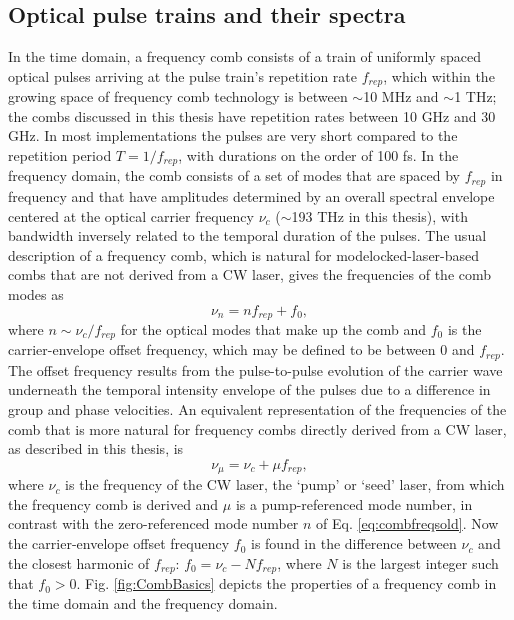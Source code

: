 \subsection{Optical pulse trains and their spectra}

In the time domain, a frequency comb consists of a train of uniformly spaced optical pulses arriving at the pulse train's repetition rate $f_{rep}$, which within the growing space of frequency comb technology is between $\sim$10 MHz and $\sim$1 THz; the combs discussed in this thesis have repetition rates between 10 GHz and 30 GHz. In most implementations the pulses are very short compared to the repetition period $T=1/f_{rep}$, with durations on the order of 100 fs. In the frequency domain, the comb consists of a set of modes that are spaced by $f_{rep}$ in frequency and that have amplitudes determined by an overall spectral envelope centered at the optical carrier frequency $\nu_c$ ($\sim$193 THz in this thesis), with bandwidth inversely related to the temporal duration of the pulses. The usual description of a frequency comb, which is natural for modelocked-laser-based combs that are not derived from a CW laser, gives the frequencies of the comb modes as 
\begin{equation}
\nu_n=nf_{rep}+f_0, \label{eq:combfreqsold}
\end{equation} 
where $n\sim \nu_c/f_{rep}$ for the optical modes that make up the comb and $f_0$ is the carrier-envelope offset frequency, which may be defined to be between $0$ and $f_{rep}$. The offset frequency results from the pulse-to-pulse evolution of the carrier wave underneath the temporal intensity envelope of the pulses due to a difference in group and phase velocities. An equivalent representation of the frequencies of the comb that is more natural for frequency combs directly derived from a CW laser, as described in this thesis, is
\begin{equation}
\nu_\mu=\nu_c+\mu f_{rep}, \label{eq:combfreqsnew}
\end{equation} 
where $\nu_c$ is the frequency of the CW laser, the `pump' or `seed' laser, from which the frequency comb is derived and $\mu$ is a pump-referenced mode number, in contrast with the zero-referenced mode number $n$ of Eq. \ref{eq:combfreqsold}. Now the carrier-envelope offset frequency $f_0$ is found in the difference between $\nu_c$ and the closest harmonic of $f_{rep}$: $f_0=\nu_c-N f_{rep}$, where $N$ is the largest integer such that $f_0>0$. Fig. \ref{fig:CombBasics} depicts the properties of a frequency comb in the time domain and the frequency domain.

